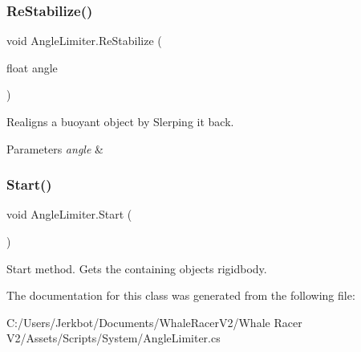 \mbox{\label{class_angle_limiter_afced607afbb55c3efcd949ee0e397b1a}} 
\subsubsection{\texorpdfstring{Re\+Stabilize()}{ReStabilize()}}
{\footnotesize\ttfamily void Angle\+Limiter.\+Re\+Stabilize (\begin{DoxyParamCaption}\item[{float}]{angle }\end{DoxyParamCaption})\hspace{0.3cm}{\ttfamily [private]}}



Realigns a buoyant object by Slerping it back. 


\begin{DoxyParams}{Parameters}
{\em angle} & \\
\hline
\end{DoxyParams}
\mbox{\label{class_angle_limiter_a89e574bae24693203bab055a3a4fd184}} 
\subsubsection{\texorpdfstring{Start()}{Start()}}
{\footnotesize\ttfamily void Angle\+Limiter.\+Start (\begin{DoxyParamCaption}{ }\end{DoxyParamCaption})\hspace{0.3cm}{\ttfamily [private]}}



Start method. Gets the containing object\textquotesingle{}s rigidbody. 



The documentation for this class was generated from the following file\+:\begin{DoxyCompactItemize}
\item 
C\+:/\+Users/\+Jerkbot/\+Documents/\+Whale\+Racer\+V2/\+Whale Racer V2/\+Assets/\+Scripts/\+System/Angle\+Limiter.\+cs\end{DoxyCompactItemize}
